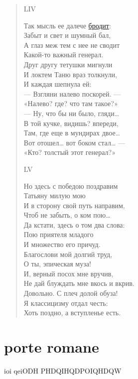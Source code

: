 \begin{verse}
LIV

Так мысль ее далече \hyperref[section:porter]{бродит}:\\
Забыт и свет и шумный бал,\\
А глаз меж тем с нее не сводит\\
Какой-то важный генерал.\\
Друг другу тетушки мигнули\\
И локтем Таню враз толкнули,\\
И каждая шепнула ей:\\
— Взгляни налево поскорей. —\\
«Налево? где? что там такое?»\\
— Ну, что бы ни было, гляди…\\
В той кучке, видишь? впереди,\\
Там, где еще в мундирах двое…\\
Вот отошел… вот боком стал… —\\
«Кто? толстый этот генерал?»

LV

Но здесь с победою поздравим\\
Татьяну милую мою\\
И в сторону свой путь направим,\\
Чтоб не забыть, о ком пою…\\
Да кстати, здесь о том два слова:\\
Пою приятеля младого\\
И множество его причуд.\\
Благослови мой долгий труд,\\
О ты, эпическая муза!\\
И, верный посох мне вручив,\\
Не дай блуждать мне вкось и вкрив.\\
Довольно. С плеч долой обуза!\\
Я классицизму отдал честь:\\
Хоть поздно, а вступленье есть.
\end{verse}

\section{porte romane}
\label{section:porter}
ioi	qeiODH	PHDQIHQDPOIQHDQW

